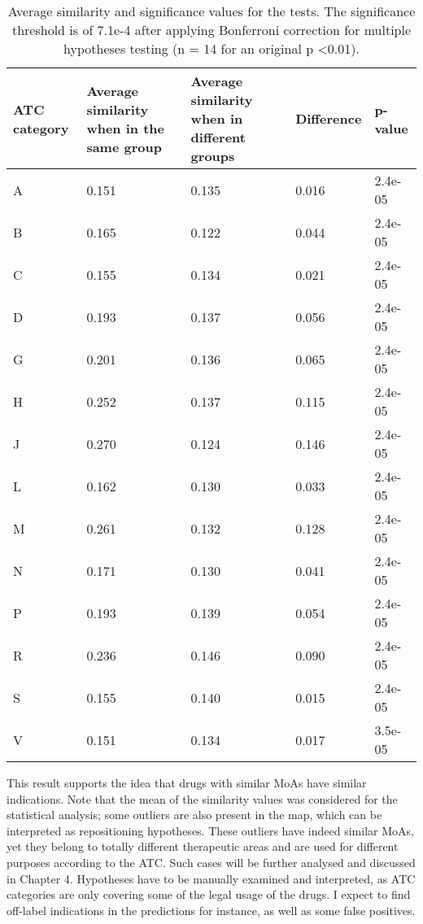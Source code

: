 \begin{table}[htbp]
\footnotesize
\begin{tabular}{|p{2cm}|p{3.5cm}|p{3.5cm}|p{2cm}|p{2cm}|}
\hline
\textbf{ATC category} & \textbf{Average similarity when in the same group} & \textbf{Average similarity when in different groups} & \textbf{Difference} & \textbf{p-value} \\ \hline
A & 0.151 & 0.135 & 0.016 & 2.4e-05 \\ \hline
B & 0.165 & 0.122 & 0.044 & 2.4e-05 \\ \hline
C & 0.155 & 0.134 & 0.021 & 2.4e-05 \\ \hline
D & 0.193 & 0.137 & 0.056 & 2.4e-05 \\ \hline
G & 0.201 & 0.136 & 0.065 & 2.4e-05 \\ \hline
H & 0.252 & 0.137 & 0.115 & 2.4e-05 \\ \hline
J & 0.270 & 0.124 & 0.146 & 2.4e-05 \\ \hline
L & 0.162 & 0.130 & 0.033 & 2.4e-05 \\ \hline
M & 0.261 & 0.132 & 0.128 & 2.4e-05 \\ \hline
N & 0.171 & 0.130 & 0.041 & 2.4e-05 \\ \hline
P & 0.193 & 0.139 & 0.054 & 2.4e-05 \\ \hline
R & 0.236 & 0.146 & 0.090 & 2.4e-05 \\ \hline
S & 0.155 & 0.140 & 0.015 & 2.4e-05 \\ \hline
V & 0.151 & 0.134 & 0.017 & 3.5e-05 \\ \hline
\end{tabular}
\caption{Average similarity and significance values for the tests. The significance threshold is of 7.1e-4 after applying Bonferroni correction for multiple hypotheses testing (n = 14 for an original p \textless 0.01).}
\label{table:tablepvalues}
\end{table}

This result supports the idea that drugs with similar MoAs have similar indications. Note that the mean of the similarity values was considered for the statistical analysis; some outliers are also present in the map, which can be interpreted as repositioning hypotheses. These outliers have indeed similar MoAs, yet they belong to totally different therapeutic areas and are used for different purposes according to the ATC. Such cases will be further analysed and discussed in Chapter 4. Hypotheses have to be manually examined and interpreted, as ATC categories are only covering some of the legal usage of the drugs. I expect to find off-label indications in the predictions for instance, as well as some false positives.

